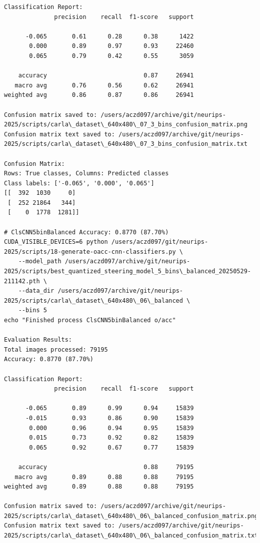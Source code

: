 \begin{verbatim}
Classification Report:
              precision    recall  f1-score   support

      -0.065       0.61      0.28      0.38      1422
       0.000       0.89      0.97      0.93     22460
       0.065       0.79      0.42      0.55      3059

    accuracy                           0.87     26941
   macro avg       0.76      0.56      0.62     26941
weighted avg       0.86      0.87      0.86     26941

Confusion matrix saved to: /users/aczd097/archive/git/neurips-2025/scripts/carla\_dataset\_640x480\_07_3_bins_confusion_matrix.png
Confusion matrix text saved to: /users/aczd097/archive/git/neurips-2025/scripts/carla\_dataset\_640x480\_07_3_bins_confusion_matrix.txt

Confusion Matrix:
Rows: True classes, Columns: Predicted classes
Class labels: ['-0.065', '0.000', '0.065']
[[  392  1030     0]
 [  252 21864   344]
 [    0  1778  1281]]

# ClsCNN5binBalanced Accuracy: 0.8770 (87.70%) 
CUDA_VISIBLE_DEVICES=6 python /users/aczd097/git/neurips-2025/scripts/18-generate-oacc-cnn-classifiers.py \
    --model_path /users/aczd097/archive/git/neurips-2025/scripts/best_quantized_steering_model_5_bins\_balanced_20250529-211142.pth \
    --data_dir /users/aczd097/archive/git/neurips-2025/scripts/carla\_dataset\_640x480\_06\_balanced \
    --bins 5
echo "Finished process ClsCNN5binBalanced o/acc"

Evaluation Results:
Total images processed: 79195
Accuracy: 0.8770 (87.70%)

Classification Report:
              precision    recall  f1-score   support

      -0.065       0.89      0.99      0.94     15839
      -0.015       0.93      0.86      0.90     15839
       0.000       0.96      0.94      0.95     15839
       0.015       0.73      0.92      0.82     15839
       0.065       0.92      0.67      0.77     15839

    accuracy                           0.88     79195
   macro avg       0.89      0.88      0.88     79195
weighted avg       0.89      0.88      0.88     79195

Confusion matrix saved to: /users/aczd097/archive/git/neurips-2025/scripts/carla\_dataset\_640x480\_06\_balanced_confusion_matrix.png
Confusion matrix text saved to: /users/aczd097/archive/git/neurips-2025/scripts/carla\_dataset\_640x480\_06\_balanced_confusion_matrix.txt


\end{verbatim}
